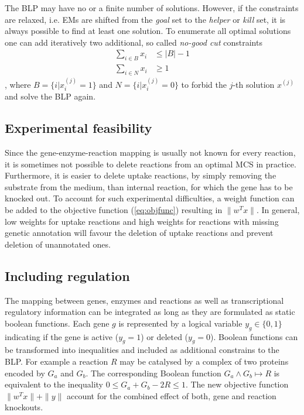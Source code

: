 \documentclass{llncs}
\begin{document}
The BLP may have no or a finite number of solutions.
However, if the constraints are relaxed, i.e. EMs are shifted from the 
\emph{goal} set to the \emph{helper} or \emph{kill} set,
it is always possible to find at least one solution.
To enumerate all optimal solutions one can add iteratively 
two additional, so called \emph{no-good cut} constraints 
\begin{subequations}
    \begin{align}
        \sum_{i \in B} x_i & \leq |B| -1  \\
        \sum_{i \in N} x_i & \geq 1       
    \end{align}
\end{subequations}, 
where $B = \{i |x_{i}^{(j)} = 1\}$ and $N = \{i |x_{i}^{(j)} = 0\}$ to
forbid the $j$-th solution $x^{(j)}$ and solve the BLP again.

\subsection{Experimental feasibility}
Since the gene-enzyme-reaction mapping is usually not known for every reaction, 
it is sometimes not possible to delete reactions from an optimal MCS in practice. 
Furthermore, it is easier to delete uptake reactions, by simply
removing the substrate from the medium, than internal reaction, for which the 
gene has to be knocked out.
To account for such experimental difficulties, a weight function can be
added to the objective function (\ref{eq:objfunc})
resulting in $\|w^{T}x\|$. 
In general, low weights for uptake reactions and high weights for reactions
with missing genetic annotation will favour the deletion of uptake reactions
and prevent deletion of unannotated ones.

\subsection{Including regulation}
The mapping between genes, enzymes and reactions as well as transcriptional 
regulatory information can be integrated as long as they are formulated 
as static boolean functions. Each gene $g$ is represented by a logical variable 
$y_{g} \in \{0,1\}$ indicating if the gene is active ($y_{g}=1$) or 
deleted ($y_{g}=0$).
Boolean functions can be transformed into inequalities and included as 
additional constrains to the BLP.
For example a reaction $R$ may be catalysed by a complex of two proteins encoded
by $G_{a}$ and $G_{b}$. The corresponding Boolean function 
$G_{a} \land G_{b} \mapsto R$ is equivalent to the inequality 
$0 \leq G_{a} + G_{b} - 2R \leq 1$.
The new objective function $\|w^{T} x \| + \|y\|$ account for 
the combined effect of both, gene and reaction knockouts.
\end{document}
